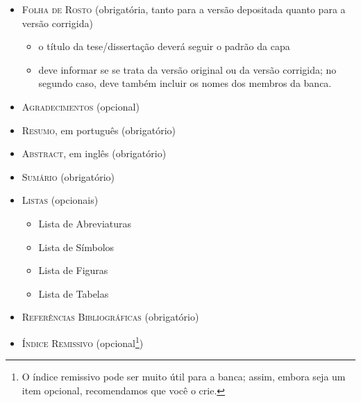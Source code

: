 \begin{itemize}
  \item \textsc{Folha de Rosto} (obrigatória, tanto para a versão
  depositada quanto para a versão corrigida)
  \begin{itemize}
    \item o título da tese/dissertação deverá seguir o padrão da capa

    \item deve informar se se trata da versão original ou da versão
    corrigida; no segundo caso, deve também incluir os nomes
    dos membros da banca.
  \end{itemize}

  \item \textsc{Agradecimentos} (opcional)

  \item \textsc{Resumo}, em português (obrigatório)

  \item \textsc{Abstract}, em inglês (obrigatório)

  \item \textsc{Sumário} (obrigatório)

  \item \textsc{Listas} (opcionais)
  \begin{itemize}
    \item Lista de Abreviaturas
    \item Lista de Símbolos
    \item Lista de Figuras
    \item Lista de Tabelas
  \end{itemize}

  \item \textsc{Referências Bibliográficas} (obrigatório)

  \item \textsc{Índice Remissivo} (opcional\footnote{O índice remissivo
   pode ser muito útil para a banca; assim, embora seja um item opcional,
   recomendamos que você o crie.})
\end{itemize}
